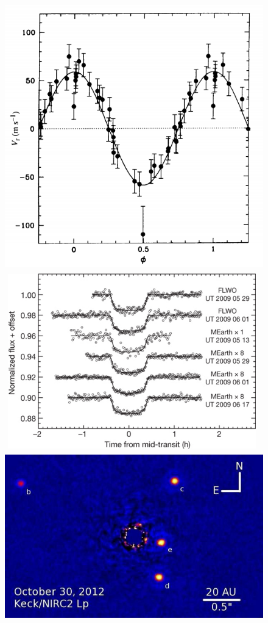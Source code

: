 \begin{figure}
\centering
\includegraphics[scale=.2]{figures/51pegRV.png}
\includegraphics[scale=.2]{figures/gj1214transit.png}
\includegraphics[scale=.2]{figures/hr8799nirc2.png}

\end{figure}
